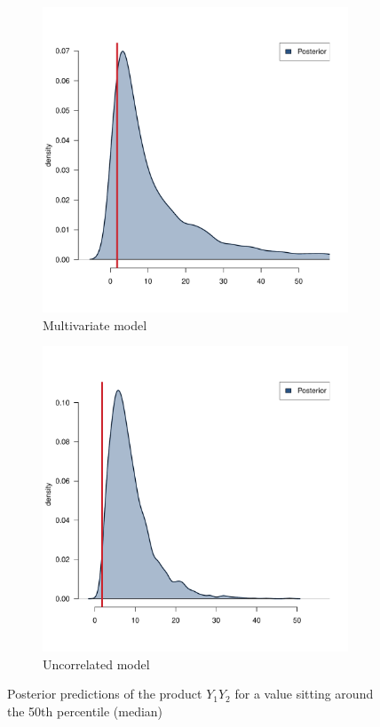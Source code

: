 \begin{figure}[htb]
	\centering
	\begin{subfigure}{0.4\textwidth}
		\includegraphics{./Figures/50th-percentile_corr.pdf}
		\caption{Multivariate model}
	\end{subfigure}
	\hfil
	\begin{subfigure}{0.4\textwidth}
		\includegraphics{./Figures/50th-percentile_uncorr.pdf}
		\caption{Uncorrelated model}
	\end{subfigure}
	\caption{Posterior predictions of the product \( Y_1 Y_2 \) for a value sitting around the 50\textup{th} percentile (\ie median)}
	\label{fig::res-50}
\end{figure}

